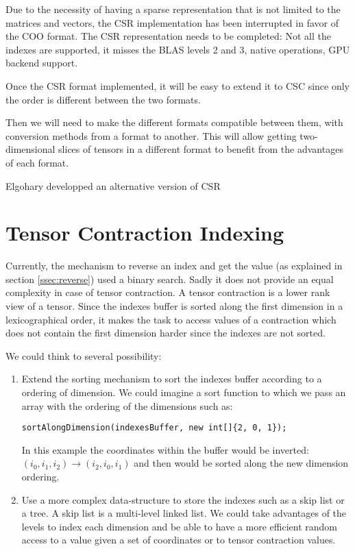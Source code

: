 Due to the necessity of having a sparse representation that is not limited to the matrices and vectors, the CSR implementation has been interrupted in favor of the COO format. The CSR representation needs to be completed: Not all the indexes are supported, it misses the BLAS levels 2 and 3, native operations, GPU backend support. 

Once the CSR format implemented, it will be easy to extend it to CSC since only the order is different between the two formats.

Then we will need to make the different formats compatible between them, with conversion methods from a format to another. This will allow getting two-dimensional slices of tensors in a different format to benefit from the advantages of each format.

Elgohary \cite{Elgohary:2016:CLA:2994509.2994515} developped an alternative version of CSR

\section{Tensor Contraction Indexing}

Currently, the mechanism to reverse an index and get the value (as explained in section \ref{ssec:reverse}) used a binary search. Sadly it does not provide an equal complexity in case of tensor contraction. A tensor contraction is a lower rank view of a tensor. Since the indexes buffer is sorted along the first dimension in a lexicographical order, it makes the task to access values of a contraction which does not contain the first dimension harder since the indexes are not sorted.

We could think to several possibility:
\begin{enumerate}
	\item Extend the sorting mechanism to sort the indexes buffer according to a ordering of dimension. We could imagine a sort function to which we pass an array with the ordering of the dimensions such as:
	\begin{lstlisting}[style=nonumbers]
		sortAlongDimension(indexesBuffer, new int[]{2, 0, 1});
	\end{lstlisting}
	In this example the coordinates within the buffer would be inverted:\\
	\qquad $(i_{0}, i_{1}, i_{2})  \rightarrow (i_{2}, i_{0}, i_{1})$  
	and then would be sorted along the new dimension ordering.
	\item Use a more complex data-structure to store the indexes such as a skip list or a tree. A skip list is a multi-level linked list. We could take advantages of the levels to index each dimension and be able to have a more efficient random access to a value given a set of coordinates or to tensor contraction values.
\end{enumerate} 

